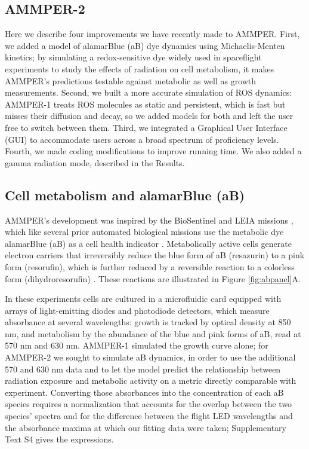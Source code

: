 \documentclass{asmarticle}
\begin{document}
\subsection{AMMPER-2}
Here we describe four improvements we have recently made to AMMPER. First, we added a model of alamarBlue (aB) dye dynamics using Michaelis-Menten kinetics; by simulating a redox-sensitive dye widely used in spaceflight experiments to study the effects of radiation on cell metabolism, it makes AMMPER's predictions testable against metabolic as well as growth measurements. Second, we built a more accurate simulation of ROS dynamics: AMMPER-1 treats ROS molecules as static and persistent, which is fast but misses their diffusion and decay, so we added models for both and left the user free to switch between them. Third, we integrated a Graphical User Interface (GUI) to accommodate users across a broad spectrum of proficiency levels. Fourth, we made coding modifications to improve running time. We also added a gamma radiation mode, described in the Results.

\subsection{Cell metabolism and alamarBlue (aB)}
AMMPER's development was inspired by the BioSentinel and LEIA missions \cite{lera2021biosensor, ricco2020biosentinel, santa2020biosentinel}, which like several prior automated biological missions use the metabolic dye alamarBlue (aB) as a cell health indicator \cite{rampersad2012multiple, o2000investigation}. Metabolically active cells generate electron carriers that irreversibly reduce the blue form of aB (resazurin) to a pink form (resorufin), which is further reduced by a reversible reaction to a colorless form (dihydroresorufin) \cite{ring2012metabolism, lu2019consensus, saitua2017dynamic, zhao2016reconstruction, pornputtapong2015human}. These reactions are illustrated in Figure \ref{fig:abpanel}A.

In these experiments cells are cultured in a microfluidic card equipped with arrays of light-emitting diodes and photodiode detectors, which measure absorbance at several wavelengths: growth is tracked by optical density at 850 nm, and metabolism by the abundance of the blue and pink forms of aB, read at 570 nm and 630 nm. AMMPER-1 simulated the growth curve alone; for AMMPER-2 we sought to simulate aB dynamics, in order to use the additional 570 and 630 nm data and to let the model predict the relationship between radiation exposure and metabolic activity on a metric directly comparable with experiment. Converting those absorbances into the concentration of each aB species requires a normalization that accounts for the overlap between the two species' spectra and for the difference between the flight LED wavelengths and the absorbance maxima at which our fitting data were taken; Supplementary Text S4 gives the expressions.
\end{document}
